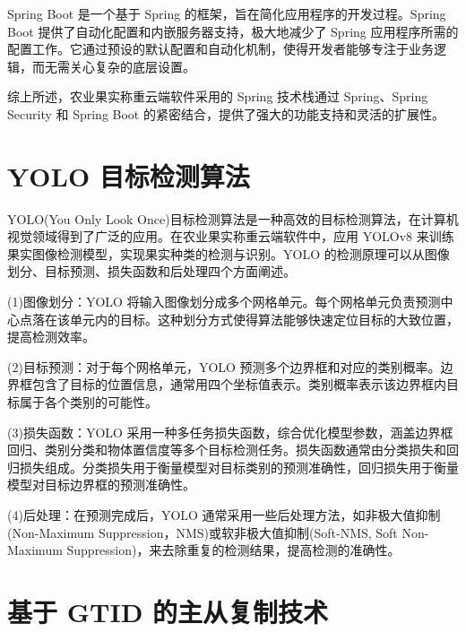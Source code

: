 Spring Boot 是一个基于 Spring 的框架，旨在简化应用程序的开发过程。Spring Boot 提供了自动化配置和内嵌服务器支持，极大地减少了 Spring 应用程序所需的配置工作。它通过预设的默认配置和自动化机制，使得开发者能够专注于业务逻辑，而无需关心复杂的底层设置\cite{Spring-Boot-概述}。

综上所述，农业果实称重云端软件采用的 Spring 技术栈通过 Spring、Spring Security 和 Spring Boot 的紧密结合，提供了强大的功能支持和灵活的扩展性。


\section{YOLO 目标检测算法}\label{sec:yolo}

YOLO(You Only Look Once)目标检测算法是一种高效的目标检测算法，在计算机视觉领域得到了广泛的应用\cite{Lin2019}。在农业果实称重云端软件中，应用 YOLOv8 来训练果实图像检测模型，实现果实种类的检测与识别。YOLO 的检测原理可以从图像划分、目标预测、损失函数和后处理四个方面阐述。

(1)图像划分：YOLO 将输入图像划分成多个网格单元。每个网格单元负责预测中心点落在该单元内的目标。这种划分方式使得算法能够快速定位目标的大致位置，提高检测效率\cite{Liu2023-yolov8}。

(2)目标预测：对于每个网格单元，YOLO 预测多个边界框和对应的类别概率。边界框包含了目标的位置信息，通常用四个坐标值表示。类别概率表示该边界框内目标属于各个类别的可能性\cite{Liu2023-yolov8}。

(3)损失函数：YOLO 采用一种多任务损失函数，综合优化模型参数，涵盖边界框回归、类别分类和物体置信度等多个目标检测任务\cite{Liu2023-yolov8}。损失函数通常由分类损失和回归损失组成。分类损失用于衡量模型对目标类别的预测准确性，回归损失用于衡量模型对目标边界框的预测准确性。

(4)后处理：在预测完成后，YOLO 通常采用一些后处理方法，如非极大值抑制(Non-Maximum Suppression，NMS)或软非极大值抑制(Soft-NMS, Soft Non-Maximum Suppression)\cite{Lin2019}，来去除重复的检测结果，提高检测的准确性。

\section{基于 GTID 的主从复制技术}\label{sec:gtid}


